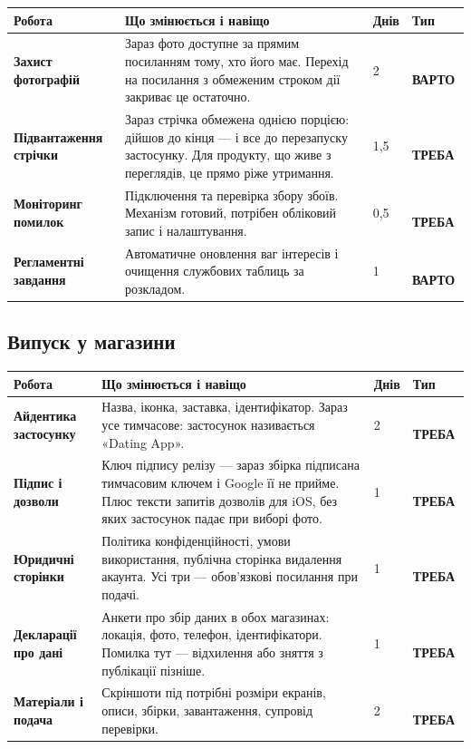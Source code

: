 \documentclass[11pt,a4paper]{article}
\newcommand{\thead}[1]{{\color{muted}\footnotesize\bfseries #1}}
\newcommand{\must}{\colorbox{criticalsoft}{\color{critical}\scriptsize\bfseries\,ТРЕБА\,}}
\newcommand{\rec}{\colorbox{accentsoft}{\color{accent}\scriptsize\bfseries\,ВАРТО\,}}
\begin{document}
\begin{xltabular}{\textwidth}{N{3.7cm} Y R{1.1cm} L{1.5cm}}
\toprule
\thead{Робота} & \thead{Що змінюється і навіщо} & \thead{Днів} & \thead{Тип} \\
\midrule

\textbf{Захист фотографій} &
Зараз фото доступне за прямим посиланням тому, хто його має. Перехід на
посилання з обмеженим строком дії закриває це остаточно. & 2 & \rec \\

\textbf{Підвантаження стрічки} &
Зараз стрічка обмежена однією порцією: дійшов до кінця --- і все до
перезапуску застосунку. Для продукту, що живе з переглядів, це прямо ріже
утримання. & 1,5 & \must \\

\textbf{Моніторинг помилок} &
Підключення та перевірка збору збоїв. Механізм готовий, потрібен обліковий
запис і налаштування. & 0,5 & \must \\

\textbf{Регламентні завдання} &
Автоматичне оновлення ваг інтересів і очищення службових таблиць за
розкладом. & 1 & \rec \\

\bottomrule
\end{xltabular}

\subsection{Випуск у магазини }

\begin{xltabular}{\textwidth}{N{3.7cm} Y R{1.1cm} L{1.5cm}}
\toprule
\thead{Робота} & \thead{Що змінюється і навіщо} & \thead{Днів} & \thead{Тип} \\
\midrule

\textbf{Айдентика застосунку} &
Назва, іконка, заставка, ідентифікатор. Зараз усе тимчасове: застосунок
називається «Dating App». & 2 & \must \\

\textbf{Підпис і дозволи} &
Ключ підпису релізу --- зараз збірка підписана тимчасовим ключем і Google її
не прийме. Плюс тексти запитів дозволів для iOS, без яких застосунок падає
при виборі фото. & 1 & \must \\

\textbf{Юридичні сторінки} &
Політика конфіденційності, умови використання, публічна сторінка видалення
акаунта. Усі три --- обов'язкові посилання при подачі. & 1 & \must \\

\textbf{Декларації про дані} &
Анкети про збір даних в обох магазинах: локація, фото, телефон,
ідентифікатори. Помилка тут --- відхилення або зняття з публікації пізніше. & 1 & \must \\

\textbf{Матеріали і подача} &
Скріншоти під потрібні розміри екранів, описи, збірки, завантаження,
супровід перевірки. & 2 & \must \\

\bottomrule
\end{xltabular}
\end{document}
